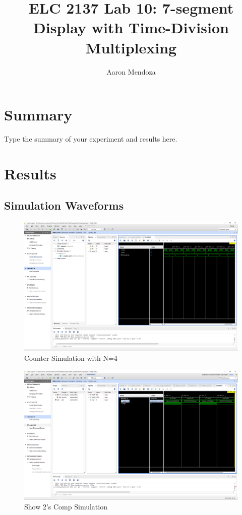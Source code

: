 \documentclass[11pt]{article}
\begin{document}
\title{ELC 2137 Lab 10: 7-segment Display with Time-Division Multiplexing}
\author{Aaron Mendoza}

\maketitle


\section*{Summary}

Type the summary of your experiment and results here.  





\section*{Results}


\subsection*{Simulation Waveforms}
\begin{figure}[ht]\centering
\includegraphics[width=1\textwidth,trim=19cm 15cm 0.5cm 4.5cm,clip]{counter_test_screenshot}
	\caption{Counter Simulation with N=4}
	\label{fig:sim_with_table}
\end{figure}


\begin{figure}[ht]\centering
\includegraphics[width=1\textwidth,trim=19cm 15cm 0.5cm 4.5cm,clip]{show2c_test_screenshot}
	\caption{Show 2's Comp Simulation}
	\label{fig:sim_with_table}
\end{figure}
\end{document}
